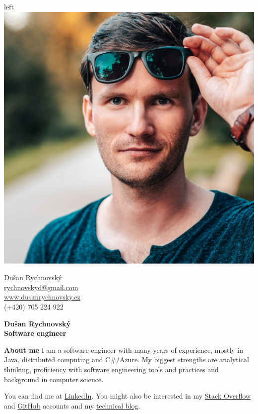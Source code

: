 \documentclass[a4paper,11pt,final,oneside]{memoir}
\newcommand{\Sep}{\vspace{1.4em}}
\newenvironment{AboutMe}
	{\ignorespaces\textbf{\color{RoyalBlue} About me}}
	{\Sep\ignorespacesafterend}
\begin{document}
\begin{dynamiccontents*}{left}
	{\hfill
		\includegraphics[width=0.9\linewidth]{photo.png}
	}

\begin{flushright}\small
	Dušan Rychnovský \\
	\url{rychnovskyd@gmail.com}  \\
	\url{www.dusanrychnovsky.cz} \\
	(+420) 705 224 922
\end{flushright}\normalsize
\end{dynamiccontents*}


\Huge\bfseries {\color{RoyalBlue} Dušan Rychnovský} \\
\Large\bfseries  Software engineer \\

\normalsize\normalfont

\begin{AboutMe}
I am a software engineer with many years of experience, mostly in Java, distributed computing and C\#/Azure. My biggest strengths are analytical thinking, proficiency with software engineering tools and practices and background in computer science.

\medskip
You can find me at 
\href{http://cz.linkedin.com/pub/du%C5%A1an-rychnovsk%C3%BD/96/a42/a0/}{LinkedIn}.
You might also be interested in my
\href{http://stackoverflow.com/users/1103412/dusan-rychnovsky}{Stack Overflow} and
\href{https://github.com/dusan-rychnovsky}{GitHub} accounts and my
\href{http://blog.dusanrychnovsky.cz}{technical blog}.
\end{AboutMe}
\end{document}
